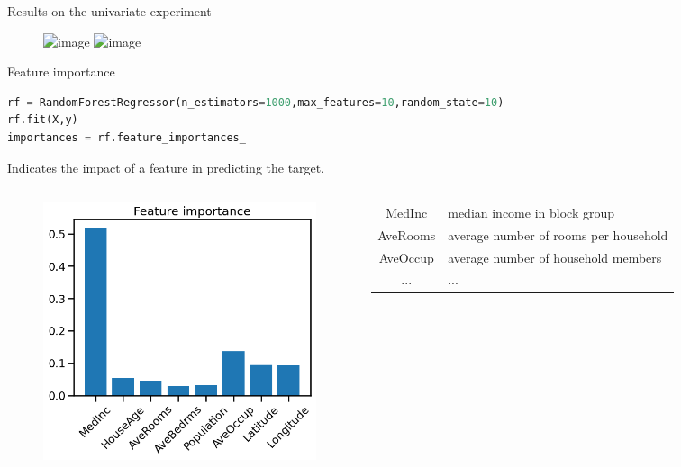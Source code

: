 \documentclass[handout]{beamer}
\begin{document}
\begin{frame}{Results on the univariate experiment}

\begin{figure}
    \centering
\caption*{
}
    \includegraphics<1>[width=.9\textwidth]{fig/L2/tree-5.png}
    \includegraphics<2>[width=.9\textwidth]{fig/L2/RF.png}

\end{figure}


\end{frame}

\begin{frame}[fragile]{Feature importance}
\begin{lstlisting}[language=Python]
rf = RandomForestRegressor(n_estimators=1000,max_features=10,random_state=10)
rf.fit(X,y)
importances = rf.feature_importances_
\end{lstlisting}
\vspace{-1.5em}
Indicates the impact of a feature in predicting the target.
\begin{columns}
    \begin{figure}
        \centering
        \includegraphics[width=.9\textwidth]{fig/L2/importance_RF.png}
    \end{figure}
    \begin{table}
    \centering
    \footnotesize
    \begin{tabular}{c|p{4.5cm}}
    MedInc & median income in block group \\
    AveRooms & average number of rooms per household \\
    AveOccup   &   average number of household members \\
    ... & ...\\
        \end{tabular}
        \end{table}

\end{columns}
\end{frame}
\end{document}

